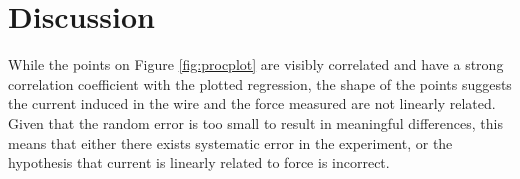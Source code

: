 \section*{Discussion}

While the points on Figure \ref{fig:procplot} are visibly correlated and have a strong correlation coefficient with the plotted regression, the shape of the points suggests the current induced in the wire and the force measured are not linearly related.
Given that the random error is too small to result in meaningful differences, this means that either there exists systematic error in the experiment, or the hypothesis that current is linearly related to force is incorrect.